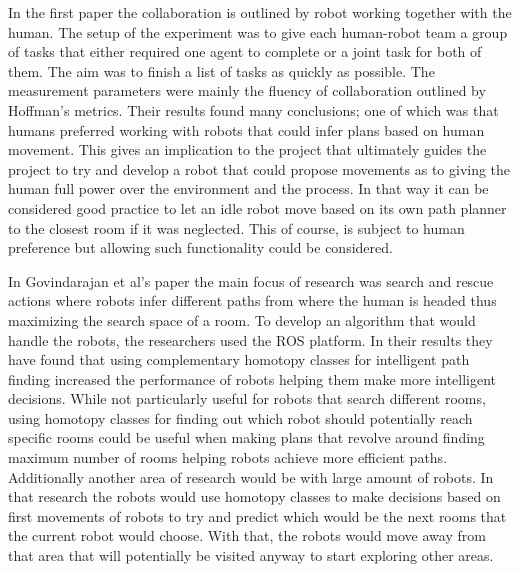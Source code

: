         In the first paper\cite{ChangLiu} the collaboration is outlined by robot working together with the human. The setup of the experiment was to give each human-robot team a group of tasks that either required one agent to complete or a joint task for both of them. The aim was to finish a list of tasks as quickly as possible. The measurement parameters were mainly the fluency of collaboration outlined by Hoffman's metrics. Their results found many conclusions; one of which was that humans preferred working with robots that could infer plans based on human movement. This gives an implication to the project that ultimately guides the project to try and develop a robot that could propose movements as to giving the human full power over the environment and the process. In that way it can be considered good practice to let an idle robot move based on its own path planner to the closest room if it was neglected. This of course, is subject to human preference but allowing such functionality could be considered.

        In Govindarajan et al's\cite{Vijay} paper the main focus of research was search and rescue actions where robots infer different paths from where the human is headed thus maximizing the search space of a room. To develop an algorithm that would handle the robots, the researchers used the ROS platform. In their results they have found that using complementary homotopy classes for intelligent path finding increased the performance of robots helping them make more intelligent decisions. While not particularly useful for robots that search different rooms, using homotopy classes for finding out which robot should potentially reach specific rooms could be useful when making plans that revolve around finding maximum number of rooms helping robots achieve more efficient paths. Additionally another area of research would be with large amount of robots. In that research the robots would use homotopy classes to make decisions based on first movements of robots to try and predict which would be the next rooms that the current robot would choose. With that, the robots would move away from that area that will potentially be visited anyway to start exploring other areas.

